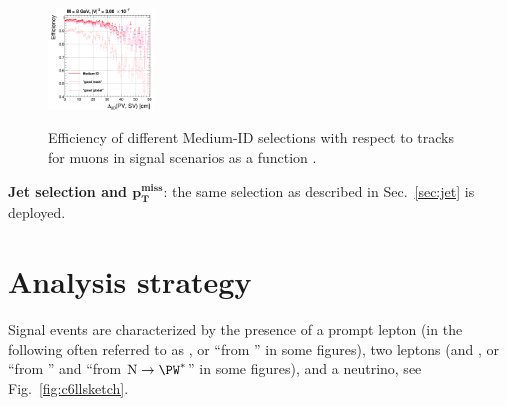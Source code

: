 \begin{figure}[h]
{{  \includegraphics[clip,trim=2cm 0 0 0,width=0.25\textwidth]{Figures/c6/object/goodTrack_goodGlobal_M-8_V-0p000547722557505_rho.png}}
}
  \caption{Efficiency of different Medium-ID selections with respect
    to tracks for \displ
    muons in signal scenarios as a function \Deltwod.}
  \label{fig:modMedium_common}
\end{figure}

\textbf{Jet selection and $\boldsymbol{p_{T}^{miss}}$}: the same selection as described in Sec.~\ref{sec:jet} is deployed.


\section{Analysis strategy}\label{sec:llanalisi}
Signal events are
characterized by the presence of a prompt lepton (in the following
often referred to as \lone, or ``\lept from \PW'' in some figures),
two \displ leptons (\ltwo and \lthree, or
``\lept from \hnl'' and ``\lept from $\hnl\to\PW^\ast$'' in some
figures), and a neutrino, see Fig.~\ref{fig:c6llsketch}.

